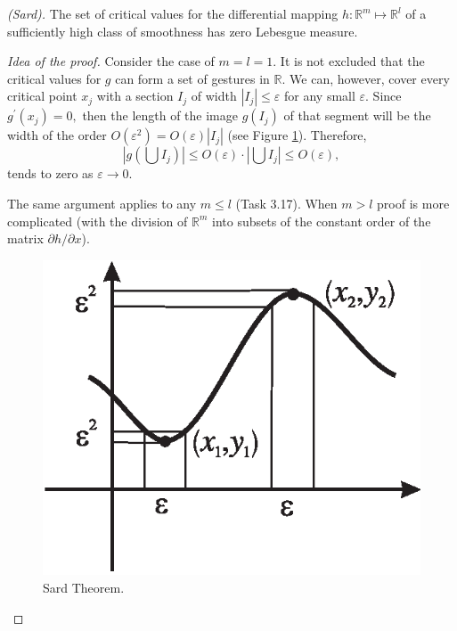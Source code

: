 \begin{theorem}\emph{(Sard).}\label{theo:3.8}
	The set of critical values for the differential mapping $h:\mathbb{R}^{m}\longmapsto \mathbb{R}^{l}$ of a sufficiently high class of smoothness has zero Lebesgue measure.
	\begin{proof}[Idea of the proof]
		Consider the case of $m = l = 1$. It is not excluded that the critical values for $g$ can form a set of gestures in $\mathbb{R}$. We can, however, cover every critical point $x_j$ with a section $I_{j}$ of width $\left\vert I_{j}\right\vert \leq \varepsilon $ for any small $\varepsilon $. Since $g^{\prime }(x_{j})=0,$ then the length of the image $g(I_{j})$ of that segment will be the width of the order $ O(\varepsilon ^{2})=O(\varepsilon )\left\vert I_{j}\right\vert $ (see Figure \ref{fig:3.9}). Therefore,
		$$
		\left\vert g\left( \bigcup I_{j}\right) \right\vert \leq O(\varepsilon
		)\cdot \left\vert \bigcup I_{j}\right\vert \leq O(\varepsilon ),
		$$
		tends to zero as $\varepsilon \rightarrow 0.$
		
		The same argument applies to any $m\leq l $ (Task 3.17). When $m>l$ proof is more complicated (with the division of $\mathbb{R}^{m}$ into subsets of the constant order of the matrix $\partial h/\partial x$).
		\begin{figure}[!ht]
			\centering
			\includegraphics [scale=1.3]{jtr39}
			\caption{Sard Theorem.}
			\label{fig:3.9}
		\end{figure}
	\end{proof}
\end{theorem}

